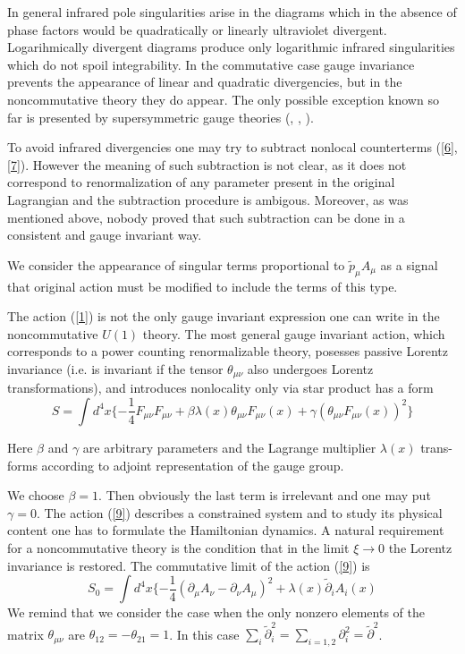 \documentclass[a4paper,12pt]{article}
\begin{document}
In general infrared pole singularities arise in the diagrams which in the
  absence of phase factors would be quadratically or linearly ultraviolet
 divergent. Logarihmically divergent diagrams produce only logarithmic
 infrared singularities which do not spoil integrability. In the
 commutative case gauge invariance prevents the appearance of linear and
 quadratic divergencies, but in the noncommutative theory they do appear.
 The only possible exception known so far is presented by supersymmetric
 gauge theories (\cite{SJ}, \cite{Z}, \cite{J-J}).

To avoid infrared divergencies one may try to subtract nonlocal
counterterms (\ref{6}, \ref{7}). However the meaning of such subtraction
 is not clear, as it does not correspond to renormalization of any
 parameter present in the original Lagrangian and the subtraction
 procedure is ambigous. Moreover, as was mentioned above, nobody proved
 that such subtraction can be done in a consistent and gauge invariant
 way.

 We consider the appearance of singular terms proportional to $
   \tilde{p}_{\mu}A_{\mu}$ as a signal that original action must be
 modified to include the terms of this type.

The action (\ref{1}) is not
 the only gauge invariant expression one can write in the noncommutative
 $U(1)$ theory. The most general gauge invariant action, which
 corresponds to a power counting renormalizable theory, posesses passive
 Lorentz invariance (i.e. is invariant if the tensor $\theta_{\mu \nu}$
 also undergoes Lorentz transformations), and introduces nonlocality only
 via star product has a form \begin{equation} S= \int d^4x \{-
 \frac{1}{4}F_{\mu \nu}F_{\mu \nu}+ \beta \lambda(x) \theta_{\mu
 \nu}F_{\mu \nu}(x)+ \gamma(\theta_{\mu \nu}F_{\mu \nu}(x))^2 \} \label{9}
 \end{equation}

 Here $\beta$ and $\gamma$ are arbitrary parameters and the
 Lagrange multiplier $\lambda(x)$ trans-\\forms according to adjoint
 representation of the gauge group.

 We choose  $ \beta=1$. Then obviously the last term is irrelevant and one
 may put $ \gamma=0$.  The action (\ref{9}) describes a
 constrained system and to study its physical content one has to formulate
 the Hamiltonian dynamics.  A natural requirement for a noncommutative
 theory is the condition that in the limit $\xi \rightarrow 0$ the Lorentz
 invariance is restored. The commutative limit of the action (\ref{9}) is 
  \begin{equation} 
 S_0= \int d^4x \{- \frac{1}{4}(\partial_{\mu}A_{\nu}- 
 \partial_{\nu}A_{\mu})^2+ \lambda(x) \tilde{\partial}_iA_i(x)
 \label{10} 
\end{equation}
We remind that we consider the case when the only nonzero 
elements of the matrix $\theta_{\mu \nu}$ are $\theta_{12}=- 
\theta_{21}=1$. In this case $\sum_i \tilde{\partial}_i^2= 
\sum_{i=1,2}\partial_i^2= \tilde{\partial}^2$.
\end{document}
